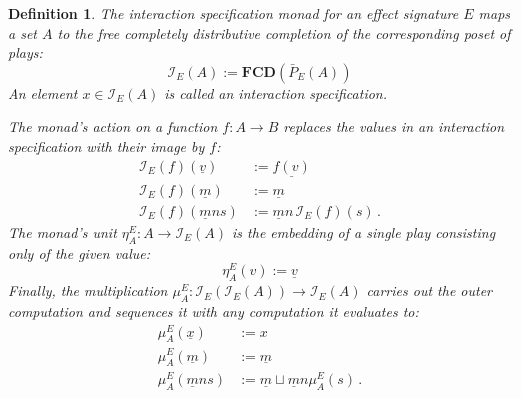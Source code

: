 \documentclass[draft,11pt]{report}
\newtheorem{definition}{Definition}
\begin{document}
\begin{definition} \label{def:intm} %
The \emph{interaction specification monad}
for an effect signature $E$
maps a set $A$
to the free completely distributive completion
of the corresponding poset of plays:
\[
    \mathcal{I}_E(A) :=
      \mathbf{FCD}(\bar{P}_E(A))
\]
An element $x \in \mathcal{I}_E(A)$ is called
an \emph{interaction specification}.

The monad's action on a function $f : A \rightarrow B$
replaces the values in
an interaction specification with their image by $f$:
\begin{align*}
  \mathcal{I}_E(f)(\underline{v}) &:= \underline{f(v)} \\
  \mathcal{I}_E(f)(\underline{m}) &:= \underline{m} \\
  \mathcal{I}_E(f)(\underline{m} n s) &:=
    \underline{m} n \, \mathcal{I}_E(f)(s) \,.
\end{align*}
The monad's unit
$\eta^E_A : A \rightarrow \mathcal{I}_E(A)$
is the embedding of a single play
consisting only of the given value:
\[
    \eta^E_A(v) := \underline{v}
\]
Finally, the multiplication
$\mu^E_A : \mathcal{I}_E(\mathcal{I}_E(A)) \rightarrow \mathcal{I}_E(A)$
carries out the outer computation and
sequences it with any computation it evaluates to:
\begin{align*}
  \mu^E_A(\underline{x}) &:= x \\
  \mu^E_A(\underline{m}) &:= \underline{m} \\
  \mu^E_A(\underline{m} n s) &:=
    \underline{m} \sqcup \underline{m} n \mu^E_A(s) \,.
\end{align*}
\end{definition}

%
\end{document}
